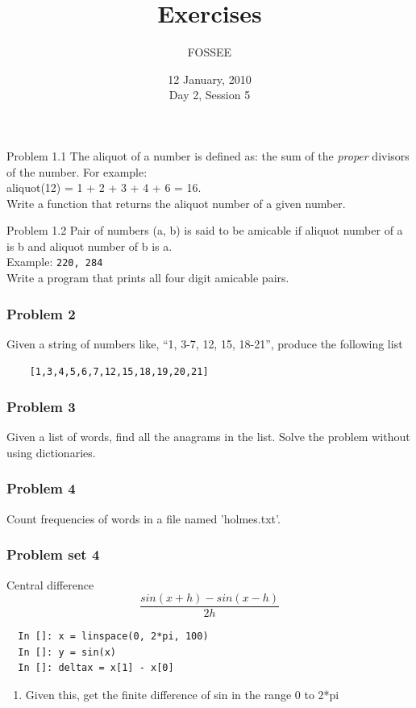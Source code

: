 \documentclass[14pt,compress]{beamer}
\title[Exercises]{Exercises}
\author[FOSSEE] {FOSSEE}
\institute[IIT Bombay] {Department of Aerospace Engineering\\IIT Bombay}
\date[] {12 January, 2010\\Day 2, Session 5}
\newcounter{time}
\newcommand{\inctime}[1]{\addtocounter{time}{#1}{\tiny \thetime\ m}}
\begin{document}
\begin{frame}
  \titlepage
\end{frame}

\begin{frame}{Problem 1.1}
  The aliquot of a number is defined as: the sum of the \emph{proper} divisors of the number. For example:\\
aliquot(12) = 1 + 2 + 3 + 4 + 6 = 16.\\
  Write a function that returns the aliquot number of a given number. 
\end{frame}

\begin{frame}{Problem 1.2}
  Pair of numbers (a, b) is said to be \alert{amicable} if aliquot number of a is b and aliquot number of b is a.\\
  Example: \texttt{220, 284}\\
  Write a program that prints all four digit amicable pairs.
  
\inctime{20}
\end{frame}



\begin{frame}[fragile]
  \frametitle{Problem 2}
  Given a string of numbers like, ``1, 3-7, 12, 15, 18-21'', produce the following list \\
  \begin{lstlisting}
    [1,3,4,5,6,7,12,15,18,19,20,21]
  \end{lstlisting}
\inctime{10}
\end{frame}


\begin{frame}
  \frametitle{Problem 3}
Given a list of words, find all the anagrams in the list.
Solve the problem without using dictionaries.

\end{frame}

\begin{frame} 
  \frametitle{Problem 4}
  Count frequencies of words in a file named 'holmes.txt'.
\inctime{25}
\end{frame}

\begin{frame}[fragile]
  \frametitle{Problem set 4}
  Central difference
  \begin{equation*}
  \frac{sin(x+h)-sin(x-h)}{2h}
  \end{equation*}
  \begin{lstlisting}
  In []: x = linspace(0, 2*pi, 100)
  In []: y = sin(x)
  In []: deltax = x[1] - x[0]
  \end{lstlisting}
  \pause
    \begin{enumerate}
      \item Given this, get the finite difference of sin in the range 0 to 2*pi
    \end{enumerate}
\end{frame}
\end{document}
